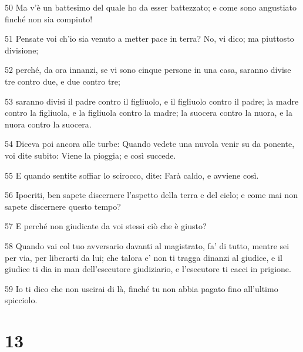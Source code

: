 \par 50 Ma v'è un battesimo del quale ho da esser battezzato; e come sono angustiato finché non sia compiuto!
\par 51 Pensate voi ch'io sia venuto a metter pace in terra? No, vi dico; ma piuttosto divisione;
\par 52 perché, da ora innanzi, se vi sono cinque persone in una casa, saranno divise tre contro due, e due contro tre;
\par 53 saranno divisi il padre contro il figliuolo, e il figliuolo contro il padre; la madre contro la figliuola, e la figliuola contro la madre; la suocera contro la nuora, e la nuora contro la suocera.
\par 54 Diceva poi ancora alle turbe: Quando vedete una nuvola venir su da ponente, voi dite subito: Viene la pioggia; e così succede.
\par 55 E quando sentite soffiar lo scirocco, dite: Farà caldo, e avviene così.
\par 56 Ipocriti, ben sapete discernere l'aspetto della terra e del cielo; e come mai non sapete discernere questo tempo?
\par 57 E perché non giudicate da voi stessi ciò che è giusto?
\par 58 Quando vai col tuo avversario davanti al magistrato, fa' di tutto, mentre sei per via, per liberarti da lui; che talora e' non ti tragga dinanzi al giudice, e il giudice ti dia in man dell'esecutore giudiziario, e l'esecutore ti cacci in prigione.
\par 59 Io ti dico che non uscirai di là, finché tu non abbia pagato fino all'ultimo spicciolo.

\chapter{13}

